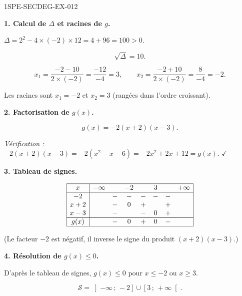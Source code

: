 \begin{corrige}{1SPE-SECDEG-EX-012}

\textbf{1. Calcul de $\Delta$ et racines de $g$.}


$\Delta = 2^2 - 4 \times (-2) \times 12 = 4 + 96 = 100 > 0$.

\[\sqrt{\Delta} = 10.\]

\[x_1 = \frac{-2 - 10}{2 \times (-2)} = \frac{-12}{-4} = 3, \qquad x_2 = \frac{-2 + 10}{2 \times (-2)} = \frac{8}{-4} = -2.\]

Les racines sont $x_1 = -2$ et $x_2 = 3$ (rangées dans l'ordre croissant).

\medskip
\textbf{2. Factorisation de $g(x)$.}


\[\boxed{g(x) = -2(x + 2)(x - 3).}\]

\textit{Vérification :} $-2(x+2)(x-3) = -2(x^2 - x - 6) = -2x^2 + 2x + 12 = g(x)$. \hfill $\checkmark$

\medskip
\textbf{3. Tableau de signes.}


\[
\begin{array}{|c|ccccccc|}
\hline
x & -\infty & & -2 & & 3 & & +\infty \\
\hline
-2 & & - & - & - & - & - & \\
x+2 & & - & 0 & + & & + & \\
x-3 & & - & & - & 0 & + & \\
\hline
g(x) & & - & 0 & + & 0 & - & \\
\hline
\end{array}
\]

(Le facteur $-2$ est négatif, il inverse le signe du produit $(x+2)(x-3)$.)

\medskip
\textbf{4. Résolution de $g(x) \leqslant 0$.}

D'après le tableau de signes, $g(x) \leqslant 0$ pour $x \leqslant -2$ ou $x \geqslant 3$.

\[\boxed{\mathcal{S} = \left]-\infty\,;\,-2\right] \cup \left[3\,;\,+\infty\right[.}\]

\end{corrige}
